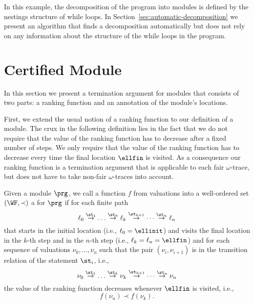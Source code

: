 In this example, the decomposition of the program into modules is defined by the nestings structure of while loops.
In Section~\ref{sec:automatic-decomposition} we present an algorithm that finds a decomposition automatically but does not rely on any information about the structure of the while loops in the program.














\section{Certified Module}
\label{sec:CertifiedModule}
In this section we present a termination argument for modules that consists of two parts: a ranking function and an annotation of the module's locations.

First, we extend the usual notion of a ranking function to our definition of a module. The crux in the following definition lies in the fact that we do not require that the value of the ranking function has to decrease after a fixed number of steps. We only require that the value of the ranking function has to decrease every time the final location $\ellfin$ is visited.
As a consequence our ranking function is a termination argument that is applicable to each fair $\omega$-trace, but does not have to take non-fair $\omega$-traces into account.

\begin{definition}
Given a module $\prg$,
we call a function $f$ from valuations into a well-ordered set  $(\WF,\prec)$ a  for $\prg$ if for each 
finite path
$$\ell_0\stackrel{\st_{1}}{\rightarrow}\dots\stackrel{\st_{k}}{\rightarrow}\ell_k\stackrel{\st_{k+1}}{\rightarrow}\cdots\stackrel{\st_n}{\rightarrow}\ell_n$$
that starts in the initial location (i.e., $\ell_0=\ellinit$) and visits the final location in the $k$-th step and in the $n$-th step (i.e., $\ell_k=\ell_n=\ellfin$)
and for each sequence of valuations $\nu_0,\dots,\nu_n$ such that the pair $(\nu_i,\nu_{i+1})$ is in the transition relation of the statement $\st_i$, i.e.,
$$\nu_0\stackrel{\st_{1}}{\rightarrow}\dots\stackrel{\st_{k}}{\rightarrow}\nu_k\stackrel{\st_{k+1}}{\rightarrow}\cdots\stackrel{\st_n}{\rightarrow}\nu_n$$
the value of the ranking function decreases whenever $\ellfin$ is visited, i.e.,
$$f(\nu_n)\prec f(\nu_k).$$
\end{definition}

